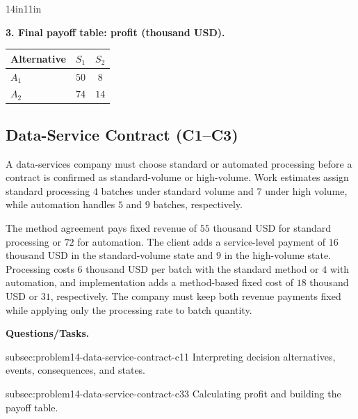 \begin{CalculationLandscape}{14in}{11in}
\noindent\begin{minipage}{\linewidth}
\textbf{3. Final payoff table: profit (thousand USD).}
\begin{center}
\begin{tabular}{@{}lcc@{}}
\toprule
Alternative & \(S_1\) & \(S_2\) \\
\midrule
\(A_1\) & \(50\) & \(8\) \\
\(A_2\) & \(74\) & \(14\) \\
\bottomrule
\end{tabular}
\end{center}
\end{minipage}



\end{CalculationLandscape}


	\subsection{Data-Service Contract (C1--C3)}
	\label{sec:problem14-data-service-contract-c1-c3}

	A data-services company must choose standard or automated processing before a contract is confirmed as standard-volume or high-volume. Work estimates assign standard processing \(4\) batches under standard volume and \(7\) under high volume, while automation handles \(5\) and \(9\) batches, respectively.

	The method agreement pays fixed revenue of \(55\) thousand USD for standard processing or \(72\) for automation. The client adds a service-level payment of \(16\) thousand USD in the standard-volume state and \(9\) in the high-volume state. Processing costs \(6\) thousand USD per batch with the standard method or \(4\) with automation, and implementation adds a method-based fixed cost of \(18\) thousand USD or \(31\), respectively. The company must keep both revenue payments fixed while applying only the processing rate to batch quantity.

	\textbf{Questions/Tasks.}
	\begin{enumerate}
		\CriterionTask
		{subsec:problem14-data-service-contract-c1}{1}
		{Interpreting decision alternatives, events, consequences, and states.}

		\CriterionTask
		{subsec:problem14-data-service-contract-c3}{3}
		{Calculating profit and building the payoff table.}
	\end{enumerate}


